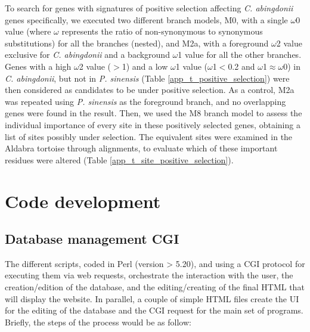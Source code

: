 To search for genes with signatures of positive selection affecting \textit{C. abingdonii} genes specifically, we executed two different branch models, M0, with a single $\omega$0 value (where $\omega$ represents the ratio of non-synonymous to synonymous substitutions) for all the branches (nested), and M2a, with a foreground $\omega$2 value exclusive for \textit{C. abingdonii} and a background $\omega$1 value for all the other branches.
Genes with a high $\omega$2 value ($>$1) and a low $\omega$1 value ($\omega$1$<$0.2 and $\omega$1$\approx\omega$0) in \textit{C. abingdonii}, but not in \textit{P. sinensis} (Table \ref{app_t_positive_selection}) were then considered as candidates to be under positive selection.
As a control, M2a was repeated using \textit{P. sinensis} as the foreground branch, and no overlapping genes were found in the result.
Then, we used the M8 branch model to assess the individual importance of every site in these positively selected genes, obtaining a list of sites possibly under selection.
The equivalent sites were examined in the Aldabra tortoise through alignments, to evaluate which of these important residues were altered (Table \ref{app_t_site_positive_selection}).

\section{Code development}

\subsection{Database management CGI} \label{ss_matmet_code_cgi}

The different scripts, coded in Perl (version > 5.20), and using a CGI protocol for executing them via web requests, orchestrate the interaction with the user, the creation/edition of the database, and the editing/creating of the final HTML that will display the website. %
In parallel, a couple of simple HTML files create the UI%
for the editing of the database and the CGI request for the main set of programs.
Briefly, the steps of the process would be as follow:

